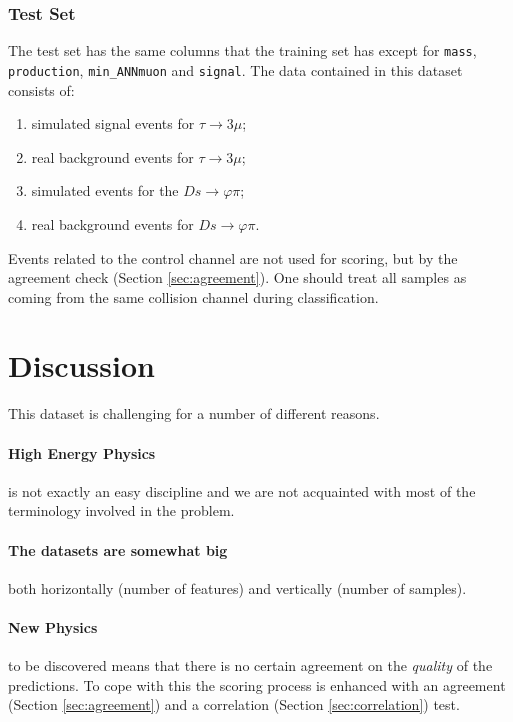 \documentclass[11pt]{article}
\begin{document}
\subsubsection{Test Set}
\label{sec:test-set}
The test set has the same columns that the training set has except for
\texttt{mass}, \texttt{production}, \texttt{min\_ANNmuon} and \texttt{signal}.
The data contained in this dataset consists of:
\begin{enumerate}
	\item simulated signal events for $\tau \rightarrow 3\mu$;
	\item real background events for $\tau \rightarrow 3\mu$;
	\item simulated events for the $Ds \rightarrow \varphi\pi$;
	\item real background events for $Ds \rightarrow \varphi\pi$.
\end{enumerate}
Events related to the control channel are not used for scoring, but by the
agreement check (Section \ref{sec:agreement}). One should treat all samples as
coming from the same collision channel during classification.

\section{Discussion}
This dataset is challenging for a number of different reasons.
\paragraph{High Energy Physics} is not exactly an easy discipline and we are not
acquainted with most of the terminology involved in the problem.
\paragraph{The datasets are somewhat big} both horizontally (number of features)
and vertically (number of samples).
\paragraph{New Physics} to be discovered means that there is no certain
agreement on the \textit{quality} of the predictions. To cope with this the
scoring process is enhanced with an agreement (Section \ref{sec:agreement}) and
a correlation (Section \ref{sec:correlation}) test.
\end{document}
